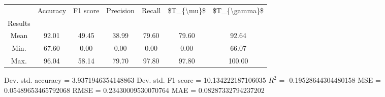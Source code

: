 \begin{tabular}{|c|c|c|c|c|c|c|}
\toprule
{} &  Accuracy &  F1 score &  Precision &  Recall &  \$T\_\{\textbackslash mu\}\$ &  \$T\_\{\textbackslash gamma\}\$ \\
Results &           &           &            &         &            &               \\
\hline
Mean    &     92.01 &     49.45 &      38.99 &   79.60 &      79.60 &         92.64 \\
Min.    &     67.60 &      0.00 &       0.00 &    0.00 &       0.00 &         66.07 \\
Max.    &     96.04 &     58.14 &      79.70 &   97.80 &      97.80 &        100.00 \\
\bottomrule
\end{tabular}

 Dev. std. accuracy = 3.9371946354148863
 Dev. std. F1-score = 10.134222187106035
 $R^2$ = -0.19528644304480158
 MSE = 0.05489653465792068
 RMSE = 0.23430009530070764
 MAE = 0.08287332794237202